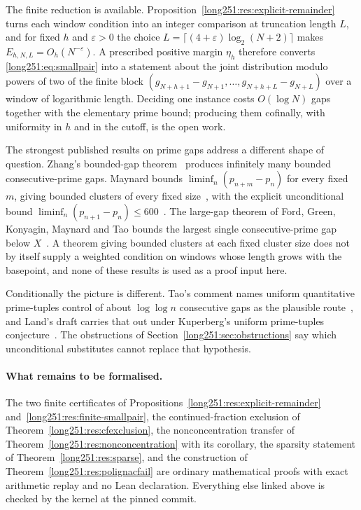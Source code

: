 \documentclass[11pt]{article}
\begin{document}
The finite reduction is available.  Proposition~\ref{long251:res:explicit-remainder}
turns each window condition into an integer comparison at truncation length
$L$, and for fixed $h$ and $\varepsilon>0$ the choice
$L=\lceil(4+\varepsilon)\log_2(N+2)\rceil$ makes $E_{h,N,L}=O_h(N^{-\varepsilon})$.
A prescribed positive margin $\eta_h$ therefore converts \eqref{long251:eq:smallpair}
into a statement about the joint distribution modulo powers of two of the
finite block $(g_{N+h+1}-g_{N+1},\ldots,g_{N+h+L}-g_{N+L})$ over a window of
logarithmic length.  Deciding one instance costs $O(\log N)$ gaps together with
the elementary prime bound; producing them cofinally, with uniformity in $h$
and in the cutoff, is the open work.

The strongest published results on prime gaps address a different shape of
question.  Zhang's bounded-gap theorem~\cite[Theorem~1, p.~1122]{zhang2014}
produces infinitely many bounded consecutive-prime gaps.  Maynard bounds
$\liminf_n(p_{n+m}-p_n)$ for every fixed $m$, giving bounded clusters of every
fixed size~\cite[Theorem~1.1, p.~384]{maynard2015}, with the explicit
unconditional bound $\liminf_n(p_{n+1}-p_n)\le600$~\cite[Theorem~1.3,
p.~385]{maynard2015}.  The large-gap theorem of Ford, Green, Konyagin, Maynard
and Tao bounds the largest single consecutive-prime gap below
$X$~\cite[Theorem~1, p.~66]{fgkmt2018}.  A theorem giving bounded clusters at
each fixed cluster size does not by itself supply a weighted condition on
windows whose length grows with the basepoint, and none of these results is
used as a proof input here.

Conditionally the picture is different.  Tao's comment names uniform
quantitative prime-tuples control of about $\log\log n$ consecutive gaps as the
plausible route~\cite[comment of 7 October 2025]{erdosproblems251thread}, and
Land's draft carries that out under Kuperberg's uniform prime-tuples
conjecture~\cite{land2026}.  The obstructions of
Section~\ref{long251:sec:obstructions} say which unconditional substitutes cannot
replace that hypothesis.

\paragraph{What remains to be formalised.}
The two finite certificates of
Propositions~\ref{long251:res:explicit-remainder} and~\ref{long251:res:finite-smallpair}, the
continued-fraction exclusion of Theorem~\ref{long251:res:cfexclusion}, the
nonconcentration transfer of Theorem~\ref{long251:res:nonconcentration} with its
corollary, the sparsity statement of Theorem~\ref{long251:res:sparse}, and the
construction of Theorem~\ref{long251:res:polignacfail} are ordinary mathematical proofs
with exact arithmetic replay and no Lean declaration.  Everything else linked
above is checked by the kernel at the pinned commit.
\end{document}
